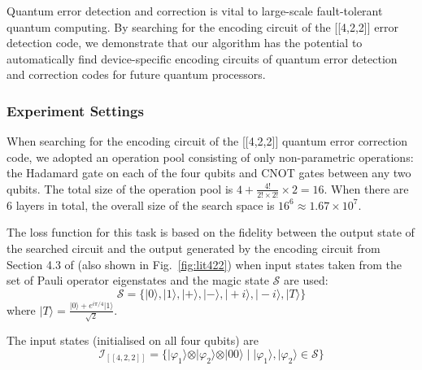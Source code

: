 \documentclass[a4paper,onecolumn,11pt]{quantumarticle}
\begin{document}
Quantum error detection and correction is vital to large-scale fault-tolerant quantum computing. By searching for the encoding circuit of the [[4,2,2]] error detection code, we demonstrate that our algorithm has the potential to automatically find  device-specific encoding circuits of quantum error detection and correction codes for future quantum processors.

\subsubsection{Experiment Settings}
When searching for the encoding circuit of the [[4,2,2]] quantum error correction code, we adopted an operation pool consisting of only non-parametric operations: the Hadamard gate on each of the four qubits and CNOT gates between any two qubits. The total size of the operation pool is $4 + \frac{4!}{2!\times2!}\times2=16$. When there are 6 layers in total, the overall size of the search space is $16^6\approx1.67\times10^7$.

The loss function for this task is based on the fidelity between the output state of the searched circuit and the output generated by the encoding circuit from Section 4.3 of \cite{qec_intro_guide} (also shown in Fig.~\ref{fig:lit422}) when input states taken from the set of Pauli operator eigenstates and the magic state $\mathcal{S}$ are used:
\begin{equation}
    \mathcal{S}=\{\vert 0 \rangle, \vert 1 \rangle, \vert + \rangle, \vert - \rangle, \vert +i \rangle, \vert -i \rangle, \vert T \rangle\}
\end{equation}
where $\vert T \rangle = \frac{\vert 0 \rangle + e^{i\pi/4}\vert 1 \rangle}{\sqrt{2}}$.





The input states (initialised on all four qubits) are
\begin{equation}
    \mathcal{I}_{[[4,2,2]]} = \{\vert \varphi_1 \rangle \otimes \vert \varphi_2 \rangle\otimes\vert 00\rangle \; \vert \; \vert \varphi_1 \rangle, \vert \varphi_2 \rangle \in \mathcal{S}\}
\end{equation}
\end{document}
